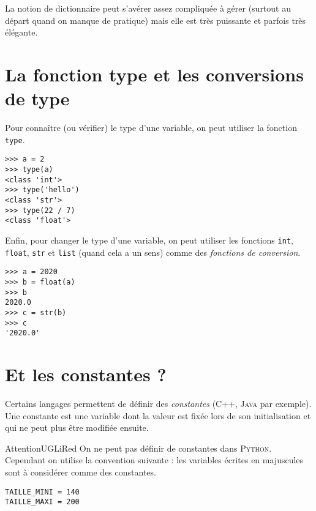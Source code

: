 La notion de dictionnaire peut s'avérer assez compliquée à gérer (surtout au départ quand on manque de pratique) mais elle est très puissante et parfois très élégante.\\

\section{La fonction type et les conversions de type}

Pour connaître (ou vérifier) le type d'une variable, on peut utiliser la fonction \texttt{type}.

\begin{pys}\begin{verbatim}
>>> a = 2
>>> type(a)
<class 'int'>
>>> type('hello')
<class 'str'>
>>> type(22 / 7)
<class 'float'>
\end{verbatim}
\end{pys}


Enfin, pour changer le type d'une variable, on peut utiliser les fonctions \texttt{int}, \texttt{float}, \texttt{str} et \texttt{list} (quand cela a un sens) comme des \textit{fonctions de conversion}.

\begin{pys}\begin{verbatim}
>>> a = 2020
>>> b = float(a)
>>>	b
2020.0
>>> c = str(b)
>>> c
'2020.0'
\end{verbatim}
\end{pys}

\section{Et les constantes ?}


Certains langages permettent de définir des \textit{constantes} (\textsc{C++}, \textsc{Java} par exemple). Une constante est une variable dont la valeur est fixée lors de son initialisation et qui ne peut plus être modifiée ensuite.

\begin{encadrecolore}{Attention}{UGLiRed}
    On ne peut pas définir de constantes dans \textsc{Python}.\\
    Cependant on utilise la convention suivante : les variables écrites en majuscules sont à considérer comme des constantes.
\end{encadrecolore}

\begin{pyc}\begin{verbatim}
TAILLE_MINI = 140
TAILLE_MAXI = 200
\end{verbatim}
\end{pyc}


